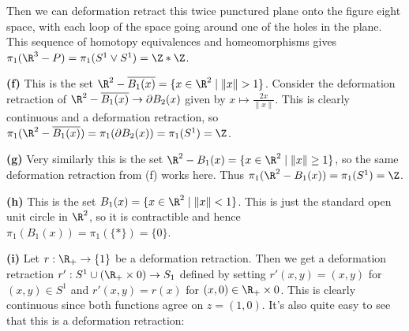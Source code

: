 \documentclass[11pt,letterpaper]{article}
\begin{document}
\begin{solution}
\begin{center}
    \end{center}
    
    Then we can deformation retract this twice punctured plane onto the figure eight space, with each loop of the space going around one of the holes in the plane. This sequence of homotopy equivalences and homeomorphisms gives $\pi_1(\R^3-P)=\pi_1(S^1\vee S^1)=\Z*\Z$. 

    \textbf{(f)} This is the set $\R^2-\overline{B_1(x)} = \{x\in \R^2 \mid \|x\|>1\}$. Consider the deformation retraction of $\R^2-\overline{B_1(x)} \to \partial B_2(x)$ given by $x\mapsto \frac{2x}{\|x\|}$. This is clearly continuous and a deformation retraction, so $\pi_1(\R^2-\overline{B_1(x)})=\pi_1(\partial B_2(x))=\pi_1(S^1)=\Z$.
    
    \textbf{(g)} Very similarly this is the set $\R^2-B_1(x)=\{x\in \R^2 \mid \|x\|\geq 1\}$, so the same deformation retraction from (f) works here. Thus $\pi_1(\R^2-B_1(x))=\pi_1(S^1)=\Z$.
    
    \textbf{(h)} This is the set $B_1(x)=\{x\in \R^2\mid \|x\|<1\}$. This is just the standard open unit circle in $\R^2$, so it is contractible and hence $\pi_1(B_1(x))=\pi_1(\{*\})=\{0\}$.
    
    \textbf{(i)} Let $r : \R_+ \to \{1\}$ be a deformation retraction. Then we get a deformation retraction $r' : S^1\cup (\R_+\times 0) \to S_1$ defined by setting $r'(x,y)=(x,y)$ for $(x,y)\in S^1$ and $r'(x,y)=r(x)$ for $(x,0)\in \R_+\times 0$. This is clearly continuous since both functions agree on $z=(1,0)$. It's also quite easy to see that this is a deformation retraction:

    \begin{center}
\end{center}
\end{solution}
\end{document}
